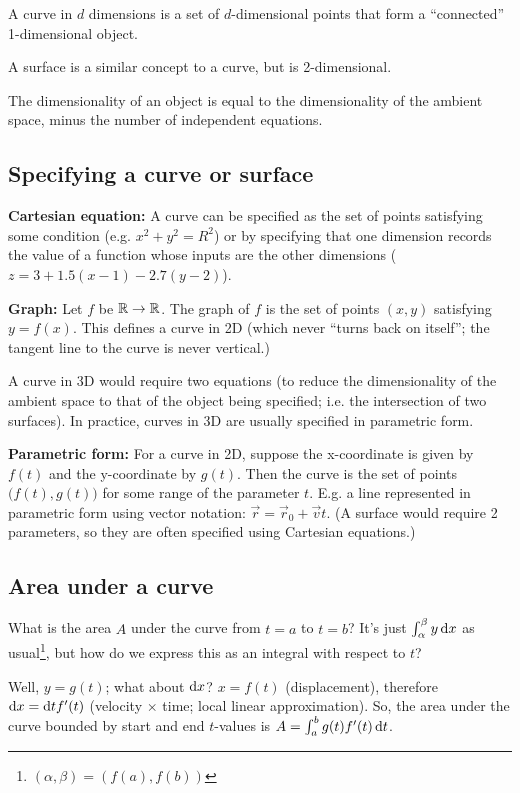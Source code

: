 A curve in $d$ dimensions is a set of $d$-dimensional points that form a
``connected'' 1-dimensional object.

A surface is a similar concept to a curve, but is 2-dimensional.

The dimensionality of an object is equal to the dimensionality of the ambient
space, minus the number of independent equations.

\subsection{Specifying a curve or surface}

\textbf{Cartesian equation:} A curve can be specified as the set of points
satisfying some condition (e.g. $x^2 + y^2 = R^2$) or by specifying that one
dimension records the value of a function whose inputs are the other
dimensions ($z = 3 + 1.5(x-1) - 2.7(y-2)$).

\textbf{Graph:} Let $f$ be $\mathbb{R} \to \mathbb{R}$. The graph of $f$ is the set of points
$(x,y)$ satisfying $y = f(x)$. This defines a curve in 2D (which never ``turns
back on itself''; the tangent line to the curve is never vertical.)

A curve in 3D would require two equations (to reduce the dimensionality of the
ambient space to that of the object being specified; i.e. the intersection of
two surfaces). In practice, curves in 3D are usually specified in parametric
form.

\textbf{Parametric form:} For a curve in 2D, suppose the x-coordinate is given
by $f(t)$ and the y-coordinate by $g(t)$. Then the curve is the set of points
$\big(f(t), g(t)\big)$ for some range of the parameter $t$. E.g. a line
represented in parametric form using vector notation:
$\vec r = \vec r_0 + \vec v t$. (A surface would require 2 parameters, so they
are often specified using Cartesian equations.)


\subsection{Area under a curve}

What is the area $A$ under the curve from $t=a$ to $t=b$? It's just
$\int_\alpha^\beta y \dx$ as usual\footnote{$(\alpha, \beta) = (f(a), f(b))$},
but how do we express this as an integral with respect to $t$?

Well, $y = g(t)$; what about $\dx$? $x = f(t)$ (displacement), therefore
$\dx = \dt f'(t)$ (velocity $\times$ time; local linear approximation). So, the
area under the curve bounded by start and end $t$-values is
$A = \int_a^b g(t) f'(t) \dt$.

